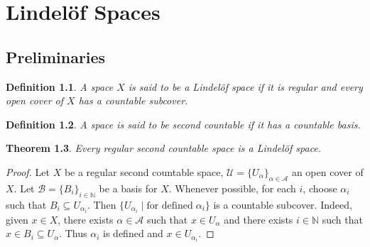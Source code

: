 \documentclass[12pt,oneside,english]{amsbook}
\numberwithin{equation}{section} %
\numberwithin{figure}{section} %
\theoremstyle{plain}
\numberwithin{section}{chapter}
\newtheorem{thm}{Theorem}[section]
\theoremstyle{plain}
\newtheorem{defn}[thm]{Definition}
\begin{document}
\chapter{Lindel\"{o}f Spaces}
\section{Preliminaries}
\begin{defn}\label{lindelof:def:1}
  A space $X$ is said to be a Lindel\"{o}f space if it is regular and every open cover of $X$ has a countable subcover.
\end{defn}

\begin{defn}\label{lindelof:def:2}
A space is said to be second countable if it has a countable basis.
\end{defn}

\begin{thm}\label{lindelof:thm:3}
  Every regular second countable space is a Lindel\"{o}f space.
\end{thm}
\begin{proof}
  Let $X$ be a regular second countable space, $\mathcal{U} = \{U_{\alpha}\}_{\alpha \in \mathcal{A}}$ an open cover of $X$. Let $\mathcal{B} = \{B_i\}_{i \in \mathbb{N}}$ be a basis for $X$. Whenever possible, for each $i$, choose $\alpha_i$ such that $B_i \subseteq U_{\alpha_i}$. Then $\{U_{\alpha_i} \; | \; \text{for defined} \; \alpha_i\}$ is a countable subcover. Indeed, given $x \in X$, there exists $\alpha \in \mathcal{A}$ such that $x \in U_{\alpha}$ and there exists $i \in \mathbb{N}$ such that $x \in B_i \subseteq U_{\alpha}$. Thus $\alpha_i$ is defined and $x \in U_{\alpha_i}$.
\end{proof}
\end{document}
